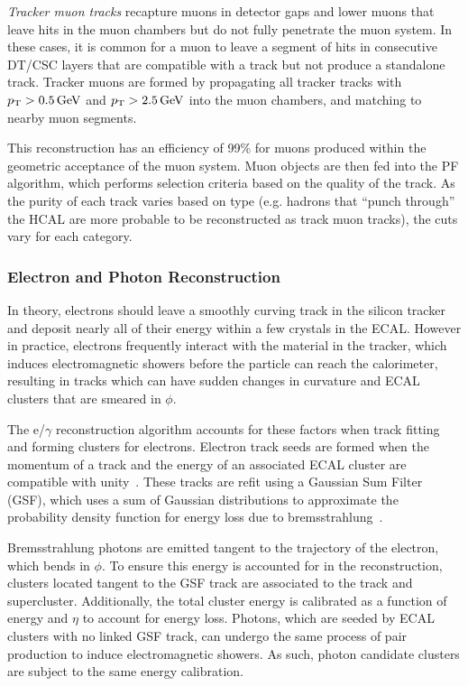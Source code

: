\textit{Tracker muon tracks} recapture muons in detector gaps and lower \PT muons that leave hits in the muon chambers but do not fully penetrate the muon system. In these cases, it is common for a muon to leave a segment of hits in consecutive DT/CSC layers that are compatible with a track but not produce a standalone track. Tracker muons are formed by propagating all tracker tracks with $p_{\mathrm{T}} > 0.5\,\text{Ge\hspace{-.08em}V}$ and $p_{\mathrm{T}}>2.5\,\text{Ge\hspace{-.08em}V}$ into the muon chambers, and matching to nearby muon segments.

This reconstruction has an efficiency of 99\% for muons produced within the geometric acceptance of the muon system\cite{Sirunyan:2313130}. Muon objects are then fed into the PF algorithm, which performs selection criteria based on the quality of the track. As the purity of each track varies based on type (e.g. hadrons that ``punch through'' the HCAL are more probable to be reconstructed as track muon tracks), the cuts vary for each category.

\subsubsection{Electron and Photon Reconstruction} \label{sec:CMS_reco_egamma}
In theory, electrons should leave a smoothly curving track in the silicon tracker and deposit nearly all of their energy within a few crystals in the ECAL. However in practice, electrons frequently interact with the material in the tracker, which induces electromagnetic showers before the particle can reach the calorimeter, resulting in tracks which can have sudden changes in curvature and ECAL clusters that are smeared in $\phi$.

The e/$\gamma$ reconstruction algorithm accounts for these factors when track fitting and forming clusters for electrons. Electron track seeds are formed when the momentum of a track and the energy of an associated ECAL cluster are compatible with unity~\cite{Sirunyan:PF}. These tracks are refit using a Gaussian Sum Filter (GSF), which uses a sum of Gaussian distributions to approximate the probability density function for energy loss due to bremsstrahlung~\cite{Adam_2005}.

Bremsstrahlung photons are emitted tangent to the trajectory of the electron, which bends in $\phi$. To ensure this energy is accounted for in the reconstruction, clusters located tangent to the GSF track are associated to the track and supercluster. Additionally, the total cluster energy is calibrated as a function of energy and $\eta$ to account for energy loss. Photons, which are seeded by ECAL clusters with no linked GSF track, can undergo the same process of pair production to induce electromagnetic showers. As such, photon candidate clusters are subject to the same energy calibration.

